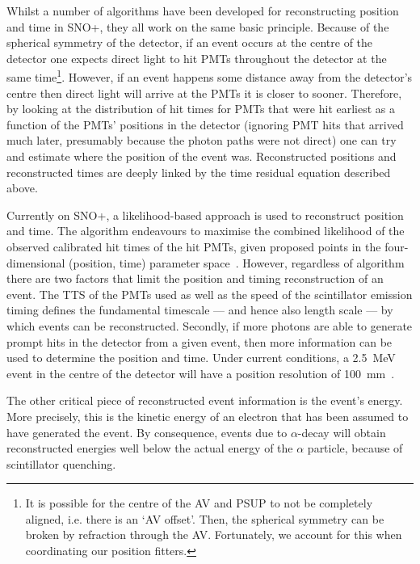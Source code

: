 Whilst a number of algorithms have been developed for reconstructing position and time in SNO+, they all work on the same basic principle. Because of the spherical symmetry of the detector, if an event occurs at the centre of the detector one expects direct light to hit PMTs throughout the detector at the same time\footnote{It is possible for the centre of the AV and PSUP to not be completely aligned, i.e. there is an `AV offset'. Then, the spherical symmetry can be broken by refraction through the AV. Fortunately, we account for this when coordinating our position fitters.}.
However, if an event happens some distance away from the detector's centre then direct light will arrive at the PMTs it is closer to sooner. Therefore, by looking at the distribution of hit times for PMTs that were hit earliest as a function of the PMTs' positions in the detector (ignoring PMT hits that arrived much later, presumably because the photon paths were not direct) one can try and estimate where the position of the event was. Reconstructed positions and reconstructed times are deeply linked by the time residual equation described above.

Currently on SNO+, a likelihood-based approach is used to reconstruct position and time. The algorithm endeavours to maximise the combined likelihood of the observed calibrated hit times of the hit PMTs, given proposed points in the four-dimensional (position, time) parameter space~\cite{jonesBackgroundRejectionNeutrinoless2011,coulterModellingReconstructionEvents2013,parkerMultiPDFMethodPosition2021}. %
However, regardless of algorithm there are two factors that limit the position and timing reconstruction of an event. The TTS of the PMTs used as well as the speed of the scintillator emission timing defines the fundamental timescale --- and hence also length scale --- by which events can be reconstructed. Secondly, if more photons are able to generate prompt hits in the detector from a given event, then more information can be used to determine the position and time. Under current conditions, a \SI{2.5}{\MeV} event in the centre of the detector will have a position resolution of \SI{100}{\mm}~\cite{parkerRecoordinatingScintEffectiveSpeedMultiPDF2023}. %

The other critical piece of reconstructed event information is the event's energy. More precisely, this is the kinetic energy of an electron that has been assumed to have generated the event. By consequence, events due to $\alpha$-decay will obtain reconstructed energies well below the actual energy of the $\alpha$ particle, because of scintillator quenching.

